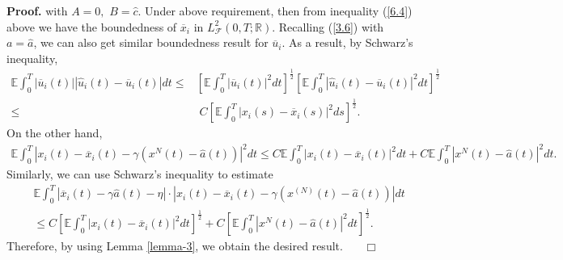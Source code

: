 \documentclass[11pt]{article}
\newenvironment{proof}[1][Proof]{\noindent \textbf{#1.} }{\ \ \  $\Box$}
\def\dbE{\mathbb{E}}
\def\dbR{\mathbb{R}}
\begin{document}
\begin{proof}
with $A=0,$ $B=\widehat{c}$. Under above requirement, then from
inequality (\ref{6.4}) above we have the boundedness of
$\overline{x}_i$ in $L^2_{\mathcal{F}}(0,T;\dbR)$. Recalling
(\ref{3.6}) with $a=\widehat{a}$, we can also get similar
boundedness result for $\overline{u}_i$. As a result, by Schwarz's
inequality,
%
\begin{align*}
\dbE\int_{0}^{T}|\overline{u}_{i}(t)||\widehat{u}_{i}(t)-\overline{u}_{i}(t)|dt
\leq & \left[ \dbE\int_{0}^{T}|\overline{u}_{i}(t)|^{2}dt\right] ^{\frac{1}{2}}
\left[\dbE\int_{0}^{T}|\widehat{u}_{i}(t)-\overline{u}_{i}(t)|^{2}dt\right] ^{\frac{1}{2}} \\
\leq & \; C\left[ \dbE\int_{0}^{T}|x_{i}(s)-\overline{x}_{i}(s)|^{2}ds\right] ^{\frac{1}{2}}.
\end{align*}
%
On the other hand,
%
\begin{eqnarray*}
\dbE\int_{0}^{T}|x_{i}(t)-\overline{x}_{i}(t)-\gamma
(x^{N}(t)-\widehat{a}(t))|^{2}dt \leq
C\dbE\int_{0}^{T}|x_{i}(t)-\overline{x}_{i}(t)|^{2}dt+C\dbE\int_{0}^{T}|x^{N}(t)-\widehat{a}(t)|^{2}dt.
\end{eqnarray*}
%
Similarly, we can use Schwarz's inequality to estimate
%
\begin{eqnarray*}
&&\dbE\int_{0}^{T}|\overline{x}_{i}(t)-\gamma \widehat{a}(t)-\eta
|\cdot |x_{i}(t)-\overline{x}_{i}(t)-\gamma
(x^{(N)}(t)-\widehat{a}(t))|dt\\
&&\leq C\left[\dbE\int_{0}^{T}|x_{i}(t)-\overline{x}_{i}(t)|^{2}dt\right]^{\frac 1 2}+C\left[\dbE%
\int_{0}^{T}|x^{N}(t)-\widehat{a}(t)|^{2}dt\right]^{\frac 1 2}.
\end{eqnarray*}
%
Therefore, by using Lemma \ref{lemma-3}, we obtain the desired result.
\hfill
\end{proof}
\end{document}
